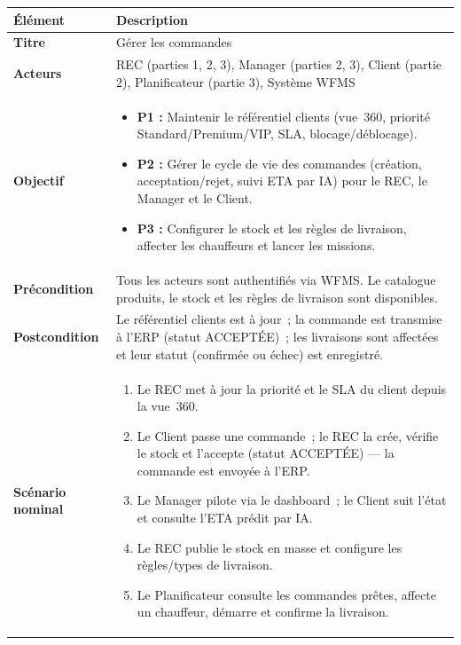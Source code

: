 \captionsetup[longtable]{justification=centering}
\setlength{\arrayrulewidth}{1pt}
\begin{longtable}{|p{4cm}|p{11cm}|}
\hline
\rowcolor{headerbg}
\textbf{Élément} & \textbf{Description} \\
\hline
\textbf{Titre} & Gérer les commandes \\
\hline
\textbf{Acteurs} & REC (parties 1, 2, 3), Manager (parties 2, 3), Client (partie 2), Planificateur (partie 3), Système WFMS \\
\hline
\textbf{Objectif} &
\begin{itemize}[nosep, leftmargin=1.4em]
    \item \textbf{P1 :} Maintenir le référentiel clients (vue~360, priorité Standard/Premium/VIP, SLA, blocage/déblocage).
    \item \textbf{P2 :} Gérer le cycle de vie des commandes (création, acceptation/rejet, suivi ETA par IA) pour le REC, le Manager et le Client.
    \item \textbf{P3 :} Configurer le stock et les règles de livraison, affecter les chauffeurs et lancer les missions.
\end{itemize} \\
\hline
\textbf{Précondition} & Tous les acteurs sont authentifiés via WFMS. Le catalogue produits, le stock et les règles de livraison sont disponibles. \\
\hline
\textbf{Postcondition} & Le référentiel clients est à jour~; la commande est transmise à l'ERP (statut ACCEPTÉE)~; les livraisons sont affectées et leur statut (confirmée ou échec) est enregistré. \\
\hline
\textbf{Scénario nominal} &
\begin{enumerate}[start=1, label=\arabic*., nosep, leftmargin=1.4em]
    \item Le REC met à jour la priorité et le SLA du client depuis la vue~360.
    \item Le Client passe une commande~; le REC la crée, vérifie le stock et l'accepte (statut ACCEPTÉE) — la commande est envoyée à l'ERP.
    \item Le Manager pilote via le dashboard~; le Client suit l'état et consulte l'ETA prédit par IA.
    \item Le REC publie le stock en masse et configure les règles/types de livraison.
    \item Le Planificateur consulte les commandes prêtes, affecte un chauffeur, démarre et confirme la livraison.
\end{enumerate} \\

\end{longtable}
